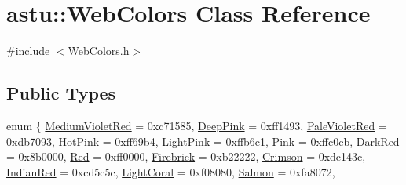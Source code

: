 \hypertarget{classastu_1_1WebColors}{}\section{astu\+:\+:Web\+Colors Class Reference}
\label{classastu_1_1WebColors}


{\ttfamily \#include $<$Web\+Colors.\+h$>$}

\subsection*{Public Types}
\begin{DoxyCompactItemize}
\item 
enum \{ \newline
\hyperlink{classastu_1_1WebColors_ac75482e858498b1b3fa521ba93fcda98ae41f97ace086f432cc9cbf3dcb55c816}{Medium\+Violet\+Red} = 0xc71585, 
\hyperlink{classastu_1_1WebColors_ac75482e858498b1b3fa521ba93fcda98a5bccce8fb9ef340c55a029c04cb687bf}{Deep\+Pink} = 0xff1493, 
\hyperlink{classastu_1_1WebColors_ac75482e858498b1b3fa521ba93fcda98a112b1d624143e0595a2668f24a3433db}{Pale\+Violet\+Red} = 0xdb7093, 
\hyperlink{classastu_1_1WebColors_ac75482e858498b1b3fa521ba93fcda98a702840fb5d85076d67dc281a33bf96c5}{Hot\+Pink} = 0xff69b4, 
\newline
\hyperlink{classastu_1_1WebColors_ac75482e858498b1b3fa521ba93fcda98a2e3617eef27967a91f5128689ccf7c27}{Light\+Pink} = 0xffb6c1, 
\hyperlink{classastu_1_1WebColors_ac75482e858498b1b3fa521ba93fcda98a896b29447a11754213ad36a227a144bb}{Pink} = 0xffc0cb, 
\hyperlink{classastu_1_1WebColors_ac75482e858498b1b3fa521ba93fcda98aae85141d971e05ef3fa9b21cd608e290}{Dark\+Red} = 0x8b0000, 
\hyperlink{classastu_1_1WebColors_ac75482e858498b1b3fa521ba93fcda98a56bb31647b5e647e11d2941f54a30781}{Red} = 0xff0000, 
\newline
\hyperlink{classastu_1_1WebColors_ac75482e858498b1b3fa521ba93fcda98af2de718f5f9fe69b6d5c25683eb88d49}{Firebrick} = 0xb22222, 
\hyperlink{classastu_1_1WebColors_ac75482e858498b1b3fa521ba93fcda98acda171d5a0f35d1615e4e69c1dddd772}{Crimson} = 0xdc143c, 
\hyperlink{classastu_1_1WebColors_ac75482e858498b1b3fa521ba93fcda98a9fd7e1c2f0791e63f4740bfef74b7faa}{Indian\+Red} = 0xcd5c5c, 
\hyperlink{classastu_1_1WebColors_ac75482e858498b1b3fa521ba93fcda98a903444da37be7fc9295643b6c0e5262b}{Light\+Coral} = 0xf08080, 
\newline
\hyperlink{classastu_1_1WebColors_ac75482e858498b1b3fa521ba93fcda98a781aaa88f28ab8b8cad911f97b436994}{Salmon} = 0xfa8072, 

\end{DoxyCompactItemize}
